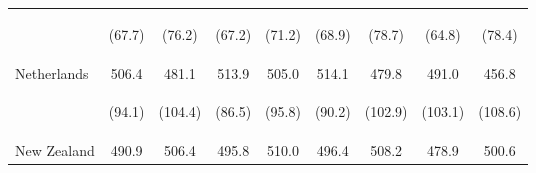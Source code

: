\begin{center}
\begin{tabular}{lcccccccc}
 & \begin{footnotesize}(67.7)\end{footnotesize} & \begin{footnotesize}(76.2)\end{footnotesize} & \begin{footnotesize}(67.2)\end{footnotesize} & \begin{footnotesize}(71.2)\end{footnotesize} & \begin{footnotesize}(68.9)\end{footnotesize} & \begin{footnotesize}(78.7)\end{footnotesize} & \begin{footnotesize}(64.8)\end{footnotesize} & \begin{footnotesize}(78.4)\end{footnotesize}\\
\noalign{\smallskip}Netherlands & 506.4 & 481.1 & 513.9 & 505.0 & 514.1 & 479.8 & 491.0 & 456.8\\
 & \begin{footnotesize}(94.1)\end{footnotesize} & \begin{footnotesize}(104.4)\end{footnotesize} & \begin{footnotesize}(86.5)\end{footnotesize} & \begin{footnotesize}(95.8)\end{footnotesize} & \begin{footnotesize}(90.2)\end{footnotesize} & \begin{footnotesize}(102.9)\end{footnotesize} & \begin{footnotesize}(103.1)\end{footnotesize} & \begin{footnotesize}(108.6)\end{footnotesize}\\
\noalign{\smallskip}New Zealand & 490.9 & 506.4 & 495.8 & 510.0 & 496.4 & 508.2 & 478.9 & 500.6\\

\end{tabular}
\end{center}
